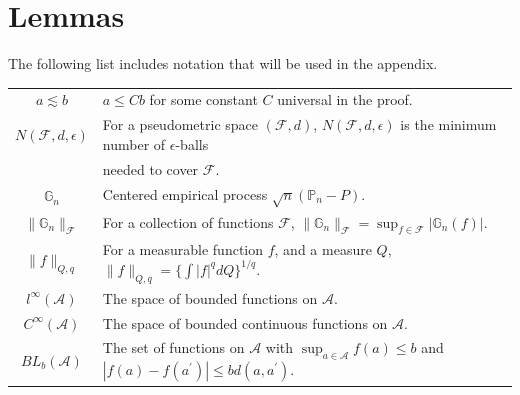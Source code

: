 \documentclass[12pt,oneside,reqno,english]{amsart}
\theoremstyle{definition}
\begin{document}
\section{Lemmas}
The following list includes notation that will be used in the appendix.
\begin{center}
\begin{tabular}{cl}
\hline 
$a \lesssim b$ & $a\leq Cb$ for some constant $C$ universal in the proof.\\
$N(\mathcal{F},d,\epsilon)$  & For a pseudometric space $(\mathcal{F},d)$, $N(\mathcal{F},d,\epsilon)$ is the minimum number of $\epsilon$-balls\\
 & needed to cover $\mathcal{F}$. \\
$\mathbb{G}_{n}$  & Centered empirical process  $\sqrt{n}(\mathbb{P}_{n}-P)$.\\
$\|\mathbb{G}_{n}\|_{\mathcal{F}}$ & For a collection of functions $\mathcal{F}$, $\|\mathbb{G}_{n}\|_{\mathcal{F}}=\sup_{f\in \mathcal{F}}|\mathbb{G}_{n}(f)|$. \\
$\|f \|_{Q,q}$  & For a measurable function $f$, and a measure $Q$, $\|f \|_{Q,q}=\{\int |f|^{q}dQ\}^{1/q}$.\\
$l^{\infty}(\mathcal{A})$  & The space of bounded functions on $\mathcal{A}$. \\
$C^{\infty}(\mathcal{A})$  & The space of bounded continuous functions on $\mathcal{A}$. \\
$BL_{b}(\mathcal{A})$  & The set of functions on $\mathcal{A}$ with $\sup_{a\in \mathcal{A}} f(a)\leq b$ and $|f(a)-f(a^{\prime})|\leq bd(a,a^{\prime})$. \\
\hline 
\end{tabular}\vspace{2cm}
\end{center}
\end{document}

